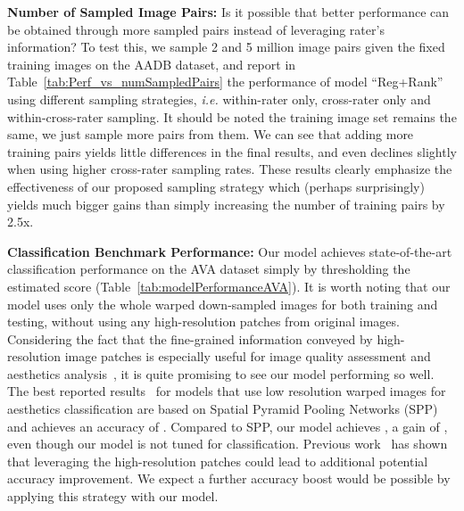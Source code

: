 \documentclass[runningheads]{llncs}
\def\ie{\emph{i.e. }}
\begin{document}
\vspace{2mm}
\noindent \textbf{Number of Sampled Image Pairs:}
Is it possible that better performance can be obtained through more sampled pairs instead of leveraging rater's information?
To test this,
we sample 2 and 5 million image pairs given the fixed training images on the AADB dataset,
and report in Table~\ref{tab:Perf_vs_numSampledPairs} the performance of model ``Reg+Rank'' using different sampling strategies,
\ie within-rater only, cross-rater only and within-cross-rater sampling.
It should be noted the training image set remains the same, we just sample more pairs from them.
We can see that adding more training pairs yields little differences in the final results,
and even declines slightly when using higher cross-rater sampling rates.
These results clearly emphasize the effectiveness of our proposed sampling
strategy which (perhaps surprisingly) yields much bigger gains than simply
increasing the number of training pairs by 2.5x.

\begin{comment}
\begin{table}[h]
\centering
\small
\caption{The perf. () of ``Reg+Rank'' with different numbers of sampled image pairs on AADB dataset.}
\begin{tabular}{|c|c|c|c|c|}
\hline
	ImgPairs      &  2 million & 5 million \\
\hline
cross-rater & 0.6346 &  0.6286 \\
within-rater & 0.6450 &  0.6448 \\
within-  cross-rater & 0.6487 & 0.6515 \\
\hline
\end{tabular}
\label{tab:modelPerformanceAADB}
\end{table}
\end{comment}



\vspace{2mm}
\noindent \textbf{Classification Benchmark Performance:}
Our model achieves state-of-the-art classification performance on the AVA
dataset simply by thresholding the estimated score (Table~\ref{tab:modelPerformanceAVA}).
It is worth noting that our model uses only the whole warped down-sampled images
for both training and testing, without using any high-resolution patches from
original images.  Considering the fact that the fine-grained information
conveyed by high-resolution image patches is especially useful for image
quality assessment and aesthetics
analysis~\cite{lu2014rapid,kang2014convolutional,xin2015iccv}, it is quite
promising to see our model performing so well.  The best reported
results~\cite{xin2015iccv} for models that use low resolution warped images for
aesthetics classification are based on
Spatial Pyramid Pooling Networks (SPP)~\cite{he2014spatial}
and achieves an
accuracy of .  Compared to SPP,
our model achieves , a gain of , even though our model is not
tuned for classification.
Previous work~\cite{kang2014convolutional,lu2014rapid,xin2015iccv} has shown
that leveraging the high-resolution patches could lead to additional 
potential accuracy improvement.
We expect a further accuracy boost would be possible by applying this strategy with our model.
\end{document}
